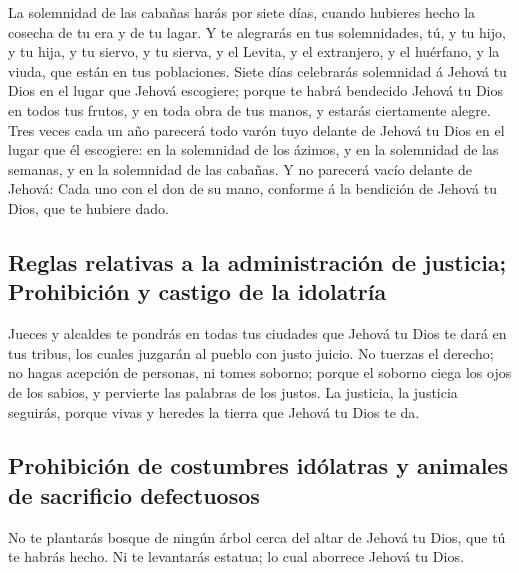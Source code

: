  La solemnidad de las cabañas harás por siete días,
cuando hubieres hecho la cosecha de tu era y de tu lagar.
 Y te alegrarás en tus solemnidades, tú, y tu hijo, y tu
hija, y tu siervo, y tu sierva, y el Levita, y el extranjero, y el
huérfano, y la viuda, que están en tus poblaciones. 
Siete días celebrarás solemnidad á Jehová tu Dios en el lugar que Jehová
escogiere; porque te habrá bendecido Jehová tu Dios en todos tus frutos,
y en toda obra de tus manos, y estarás ciertamente alegre.
 Tres veces cada un año parecerá todo varón tuyo delante
de Jehová tu Dios en el lugar que él escogiere: en la solemnidad de los
ázimos, y en la solemnidad de las semanas, y en la solemnidad de las
cabañas. Y no parecerá vacío delante de Jehová:  Cada uno
con el don de su mano, conforme á la bendición de Jehová tu Dios, que te
hubiere dado.

\hypertarget{reglas-relativas-a-la-administraciuxf3n-de-justicia-prohibiciuxf3n-y-castigo-de-la-idolatruxeda}{%
\subsection{Reglas relativas a la administración de justicia;
Prohibición y castigo de la
idolatría}\label{reglas-relativas-a-la-administraciuxf3n-de-justicia-prohibiciuxf3n-y-castigo-de-la-idolatruxeda}}

 Jueces y alcaldes te pondrás en todas tus ciudades que
Jehová tu Dios te dará en tus tribus, los cuales juzgarán al pueblo con
justo juicio.  No tuerzas el derecho; no hagas acepción
de personas, ni tomes soborno; porque el soborno ciega los ojos de los
sabios, y pervierte las palabras de los justos.  La
justicia, la justicia seguirás, porque vivas y heredes la tierra que
Jehová tu Dios te da.

\hypertarget{prohibiciuxf3n-de-costumbres-iduxf3latras-y-animales-de-sacrificio-defectuosos}{%
\subsection{Prohibición de costumbres idólatras y animales de sacrificio
defectuosos}\label{prohibiciuxf3n-de-costumbres-iduxf3latras-y-animales-de-sacrificio-defectuosos}}

 No te plantarás bosque de ningún árbol cerca del altar
de Jehová tu Dios, que tú te habrás hecho.  Ni te
levantarás estatua; lo cual aborrece Jehová tu Dios.

